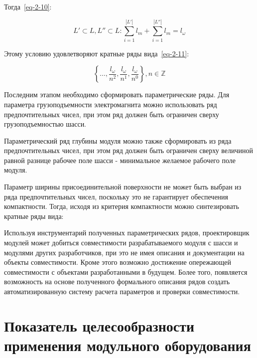 \noindent Тогда~\cref{eq-2-10}:

\begin{equation}
L' \subset L, L'' \subset L: \sum_{i=1}^{|L'|}l_m + \sum_{i=1}^{|L''|}l_m = l_\omega
\label{eq-2-10}
\end{equation}

Этому условию удовлетворяют кратные ряды вида~\cref{eq-2-11}:

\begin{equation}
\left \{ \ldots, \frac{l_\omega}{n^2}, \frac{l_\omega}{n^1}, \frac{l_\omega}{n^0} \right \}, n \in \mathbb{Z}
\label{eq-2-11}
\end{equation}


Последним этапом необходимо сформировать параметрические ряды. Для параметра грузоподъемности электромагнита можно использовать ряд предпочтительных чисел, при этом ряд должен быть ограничен сверху грузоподъемностью шасси.


Параметрический ряд глубины модуля можно также сформировать из ряда предпочтительных чисел, при этом ряд должен быть ограничен сверху величиной равной разнице  рабочее поле шасси - минимальное желаемое рабочего поле модуля.


Параметр ширины присоединительной поверхности не может быть выбран из  ряда предпочтительных чисел, поскольку это не гарантирует обеспечения компактности. Тогда, исходя из критерия компактности можно синтезировать кратные ряды вида: 


Используя инструментарий полученных параметрических рядов, проектировщик модулей может добиться совместимости разрабатываемого модуля с шасси и модулями других разработчиков, при это не имея описания и документации на объекты совместимости. Кроме этого возможно достижение опережающей совместимости с объектами разработанными в будущем. Более того, появляется возможность на основе полученного формального описания рядов создать автоматизированную систему расчета параметров и проверки совместимости.

\section{Показатель целесообразности применения модульного оборудования}

